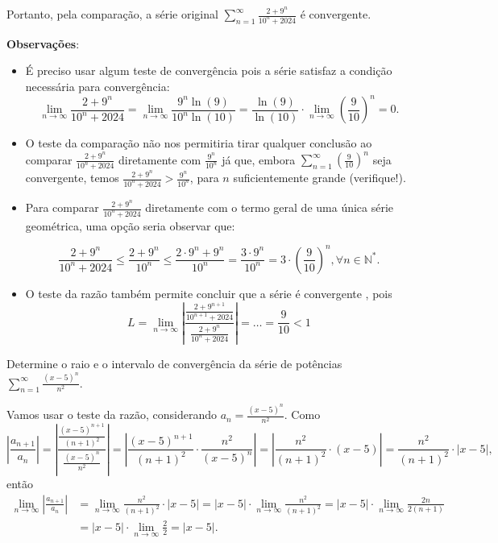 \documentclass[12pt,a4paper]{article}
\begin{document}
\begin{ExerciseList}
Portanto, pela comparação, a série original \(\boxed{\sum_{n=1}^{\infty} \frac{2+9^n}{10^n + 2024} \text{ é convergente}}\).

\textbf{Observações}:
\begin{itemize}
\item É preciso usar algum teste de convergência pois a série satisfaz a condição necessária para convergência:
\[
\lim_{n\to\infty} \frac{2+9^n}{10^n + 2024}
= \lim_{n\to\infty} \frac{9^n \ln(9)}{10^n \ln(10)}
= \frac{\ln(9)}{\ln(10)} \cdot \lim_{n\to\infty} \left(\frac{9}{10}\right)^n
= 0.
\]
\item O teste da comparação não nos permitiria tirar qualquer conclusão ao comparar $\frac{2+9^n}{10^n + 2024}$ diretamente com $\frac{9^n}{10^n}$ já que, embora \(\sum_{n=1}^{\infty} \left(\frac{9}{10}\right)^n\) seja convergente, temos $\frac{2+9^n}{10^n + 2024} > \frac{9^n}{10^n}$, para $n$ suficientemente grande (verifique!).
\item Para comparar $\frac{2+9^n}{10^n + 2024}$ diretamente com o termo geral de uma única série geométrica, uma opção seria observar que:

\[
\frac{2+9^n}{10^n + 2024}
\leq \frac{2+9^n}{10^n}
\leq \frac{2\cdot 9^n +9^n}{10^n}
= \frac{3\cdot 9^n}{10^n}
= 3 \cdot \left(\frac{9}{10}\right)^n, \forall n \in \mathbb{N}^*.
\]
\item O teste da razão também permite concluir que a série é convergente , pois
\[
L = \lim_{n \to \infty} \left|\frac{\frac{2+9^{n+1}}{10^{n+1} + 2024}}{\frac{2+9^n}{10^n + 2024}}\right| = \ldots = \frac{9}{10} < 1
\]
\end{itemize}


\Exercise[title={2,5}] Determine o raio e o intervalo de convergência da série de potências \(\sum_{n=1}^{\infty} \frac{(x-5)^n}{n^2}\).

\Answer Vamos usar o teste da razão, considerando $a_n = \frac{(x-5)^n}{n^2}$. Como
\[
    \left| \frac{a_{n+1}}{a_n} \right|
    = \left| \frac{\frac{(x-5)^{n+1}}{(n+1)^2}}{\frac{(x-5)^n}{n^2}} \right|
    = \left| \frac{(x-5)^{n+1}}{(n+1)^2} \cdot \frac{n^2}{(x-5)^n} \right|
    = \left| \frac{n^2}{(n+1)^2} \cdot (x-5) \right|
    = \frac{n^2}{(n+1)^2} \cdot \left| x-5 \right|,
\]
então
\begin{align*}
\lim_{n \to \infty} \left| \frac{a_{n+1}}{a_n} \right|
&
= \lim_{n \to \infty} \frac{n^2}{(n+1)^2} \cdot \left| x-5 \right|
= \left| x-5 \right| \cdot \lim_{n \to \infty} \frac{n^2}{(n+1)^2}
= \left| x-5 \right| \cdot \lim_{n \to \infty} \frac{2n}{2(n+1)}\\
&
= \left| x-5 \right| \cdot \lim_{n \to \infty} \frac{2}{2}
= \left| x-5 \right|.
\end{align*}


\end{ExerciseList}
\end{document}
